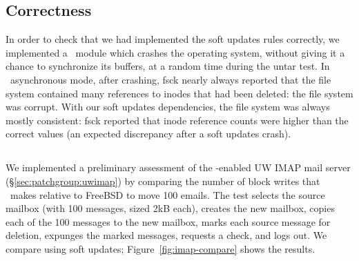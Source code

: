 \subsection {Correctness}
\label{sec:eval:correctness}

In order to check that we had implemented the soft updates rules correctly, we
implemented a \Kudos\ module which crashes the operating system, without
giving it a chance to synchronize its buffers, at a random time during the
untar test.
%
In \Kudos\ asynchronous mode, after crashing, fsck nearly always reported that
the file system contained many references to inodes that had been deleted: the
file system was corrupt.
%
With our soft updates dependencies, the file system was always mostly
consistent: fsck reported that inode reference counts were higher than the
correct values (an expected discrepancy after a soft updates crash).

\subsection {\Patchgroups}



%

\label{sec:evaluation:uwimap}
We implemented a preliminary assessment of the \patchgroup-enabled UW IMAP mail server
(\S\ref{sec:patchgroup:uwimap}) by comparing the number of block writes
that \Kudos\ makes relative to FreeBSD to move 100 emails. The test
selects the source mailbox (with 100 messages, sized 2kB each),
creates the new mailbox, copies each of the 100 messages to the new
mailbox, marks each source message for deletion, expunges the marked
messages, requests a check, and logs out. We compare using soft updates;
Figure~\ref{fig:imap-compare} shows the results.

